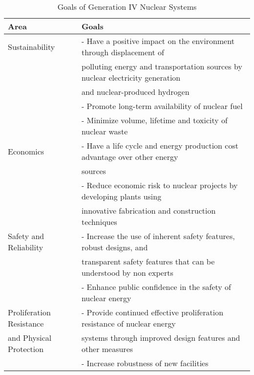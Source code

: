 \begin{table}[]
    \centering
    \onehalfspacing
    \caption{Goals of Generation IV Nuclear Systems \cite{gif_technology_2002,
    behar_technology_2014}}
	\label{tab:goals-gen4}
    \small
    \begin{tabular}{l|l}
    \hline
                               \textbf{Area} & \textbf{Goals} \\ \hline
    Sustainability   & - Have a positive impact on the environment through displacement of \\
    & polluting energy and transportation sources by nuclear electricity generation \\
    & and nuclear-produced hydrogen \\ 
    & - Promote long-term availability of nuclear fuel \\
    & - Minimize volume, lifetime and toxicity of nuclear waste \\ \hline
    Economics & - Have a life cycle and energy production cost advantage over other energy \\
    & sources \\ 
    & - Reduce economic risk to nuclear projects by developing plants using \\
    & innovative fabrication and construction techniques \\ \hline
    Safety and Reliability   & - Increase the use of inherent safety features, robust designs, and \\
    & transparent safety features that can be understood by non experts \\ 
    & - Enhance public confidence in the safety of nuclear energy \\\hline
    Proliferation Resistance & - Provide continued effective proliferation resistance of nuclear energy \\
    and Physical Protection & systems through improved design features and other measures \\ 
    & - Increase robustness of new facilities \\ \hline
    \end{tabular}
    \end{table}

